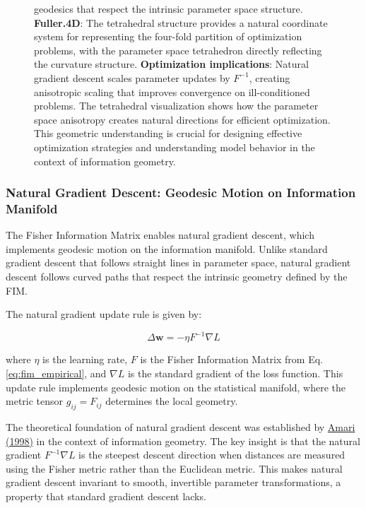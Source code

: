 \documentclass[
  10pt,
]{article}
\begin{document}
\begin{figure}
{geodesics that respect the intrinsic parameter space structure.
\textbf{Fuller.4D}: The tetrahedral structure provides a natural
coordinate system for representing the four-fold partition of
optimization problems, with the parameter space tetrahedron directly
reflecting the curvature structure. \textbf{Optimization implications}:
Natural gradient descent scales parameter updates by \(F^{-1}\),
creating anisotropic scaling that improves convergence on
ill-conditioned problems. The tetrahedral visualization shows how the
parameter space anisotropy creates natural directions for efficient
optimization. This geometric understanding is crucial for designing
effective optimization strategies and understanding model behavior in
the context of information geometry.}
\end{figure}

\hypertarget{natural-gradient-descent-geodesic-motion-on-information-manifold}{%
\subsubsection{Natural Gradient Descent: Geodesic Motion on Information
Manifold}\label{natural-gradient-descent-geodesic-motion-on-information-manifold}}

The Fisher Information Matrix enables natural gradient descent, which
implements geodesic motion on the information manifold. Unlike standard
gradient descent that follows straight lines in parameter space, natural
gradient descent follows curved paths that respect the intrinsic
geometry defined by the FIM.

The natural gradient update rule is given by:

\begin{equation}\label{eq:natural_gradient}
\Delta \mathbf{w} = -\eta F^{-1}\nabla L
\end{equation}

where \(\eta\) is the learning rate, \(F\) is the Fisher Information
Matrix from Eq. \eqref{eq:fim_empirical}, and \(\nabla L\) is the
standard gradient of the loss function. This update rule implements
geodesic motion on the statistical manifold, where the metric tensor
\(g_{ij} = F_{ij}\) determines the local geometry.

The theoretical foundation of natural gradient descent was established
by \href{https://en.wikipedia.org/wiki/Natural_gradient}{Amari (1998)}
in the context of information geometry. The key insight is that the
natural gradient \(F^{-1}\nabla L\) is the steepest descent direction
when distances are measured using the Fisher metric rather than the
Euclidean metric. This makes natural gradient descent invariant to
smooth, invertible parameter transformations, a property that standard
gradient descent lacks.
\end{document}
